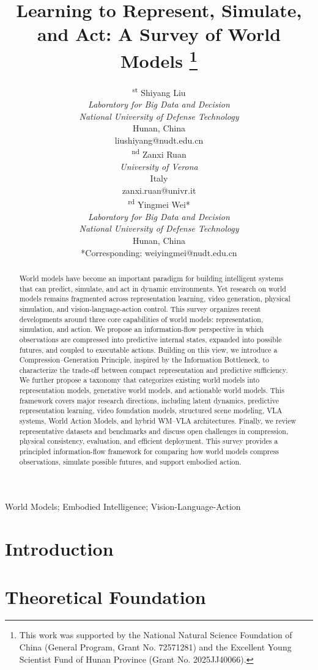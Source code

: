 \documentclass[conference]{IEEEtran}
\title{Learning to Represent, Simulate, and Act: A Survey of World Models
\thanks{This work was supported by the National Natural Science Foundation of China 
(General Program, Grant No. 72571281) and the Excellent Young Scientist Fund of Hunan Province 
(Grant No. 2025JJ40066).}
}
\author{
\begin{minipage}[t]{0.32\textwidth}
\centering
1\textsuperscript{st} Shiyang Liu\\
\textit{Laboratory for Big Data and Decision}\\
\textit{National University of Defense Technology}\\
Hunan, China\\
liushiyang@nudt.edu.cn
\end{minipage}
\hfill
\begin{minipage}[t]{0.32\textwidth}
\centering
2\textsuperscript{nd} Zanxi Ruan\\
\textit{University of Verona}\\
Italy\\
zanxi.ruan@univr.it
\end{minipage}
\hfill
\begin{minipage}[t]{0.32\textwidth}
\centering
3\textsuperscript{rd} Yingmei Wei*\\
\textit{Laboratory for Big Data and Decision}\\
\textit{National University of Defense Technology}\\
Hunan, China\\
*Corresponding: weiyingmei@nudt.edu.cn
\end{minipage}
}
\begin{document}
\maketitle

\begin{abstract}
World models have become an important paradigm for building intelligent systems that can predict, simulate, and act in dynamic environments. Yet research on world models remains fragmented across representation learning, video generation, physical simulation, and vision-language-action control. This survey organizes recent developments around three core capabilities of world models: representation, simulation, and action. We propose an information-flow perspective in which observations are compressed into predictive internal states, expanded into possible futures, and coupled to executable actions. Building on this view, we introduce a Compression–Generation Principle, inspired by the Information Bottleneck, to characterize the trade-off between compact representation and predictive sufficiency. We further propose a taxonomy that categorizes existing world models into representation models, generative world models, and actionable world models. This framework covers major research directions, including latent dynamics, predictive representation learning, video foundation models, structured scene modeling, VLA systems, World Action Models, and hybrid WM–VLA architectures. Finally, we review representative datasets and benchmarks and discuss open challenges in compression, physical consistency, evaluation, and efficient deployment. This survey provides a principled information-flow framework for comparing how world models compress observations, simulate possible futures, and support embodied action.
\end{abstract}

\begin{IEEEkeywords}
World Models; Embodied Intelligence; Vision-Language-Action
\end{IEEEkeywords}

\section{Introduction}



\section{Theoretical Foundation}
\end{document}
